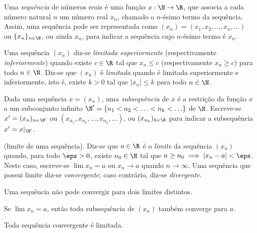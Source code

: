 \documentclass{article}
\begin{document}
\begin{defn}
    Uma \emph{sequência} de números reais é uma função \(x: \N \to \R\), que associa a cada número natural \(n\) um número real \(x_n\), chamado o \(n\)-ésimo termo da sequência. Assim, uma sequência pode ser representada como \((x_n) = (x_1, x_2, \ldots, x_n, \ldots)\) ou \(\{x_n\}_{n\in\N}\), ou ainda \(x_n\), para indicar a sequência cujo \(n\)-ésimo termo é \(x_n\).
\end{defn}

\begin{defn}
    Uma sequência \((x_n)\) diz-se \emph{limitada superiormente} (respectivamente \emph{inferiormente}) quando existe \(c \in \R\) tal que \(x_n \leq c\) (respectivamente \(x_n \geq c\)) para todo \(n \in \N\). Diz-se que \((x_n)\) é \emph{limitada} quando é limitada superiormente e inferiormente, isto é, existe \(k>0\) tal que \(|x_n| \leq k\) para todo \(n \in \N\).
\end{defn}

\begin{defn}
    Dada uma sequência \(x = (x_n)\), uma \emph{subsequência} de \(x\) é a restrição da função \(x\) a um subconjunto infinito \(\N' = \{n_1 < n_2 < \ldots < n_k < \ldots\}\) de \(\N\). Escreve-se \(x' = (x_n)_{n \in \N'}\) ou \((x_{n_1}, x_{n_2}, \ldots, x_{n_k}, \ldots)\), ou \((x_{n_k})_{k \in \N}\) para indicar a subsequência \(x' = x|_{\N'}\).
\end{defn}

\begin{defn} (limite de uma sequência).
    Diz-se que \(a \in \R\) é o \emph{limite} da sequência \((x_n)\) quando, para todo \(\eps > 0\), existe \(n_0 \in \N\) tal que \(n \geq n_0 \implies |x_n - a| < \eps\). Neste caso, escreve-se \(\lim x_n = a\) ou \(x_n \to a\) quando \(n \to \infty\). Uma sequência que possui limite diz-se \emph{convergente}; caso contrário, diz-se \emph{divergente}.
\end{defn}

\begin{prop}
    Uma sequência não pode convergir para dois limites distintos.
\end{prop}

\begin{prop}
    Se \(\lim x_n = a\), então toda subsequência de \((x_n)\) também converge para \(a\).
\end{prop}

\begin{prop}
    Toda sequência convergente é limitada.
\end{prop}
\end{document}

